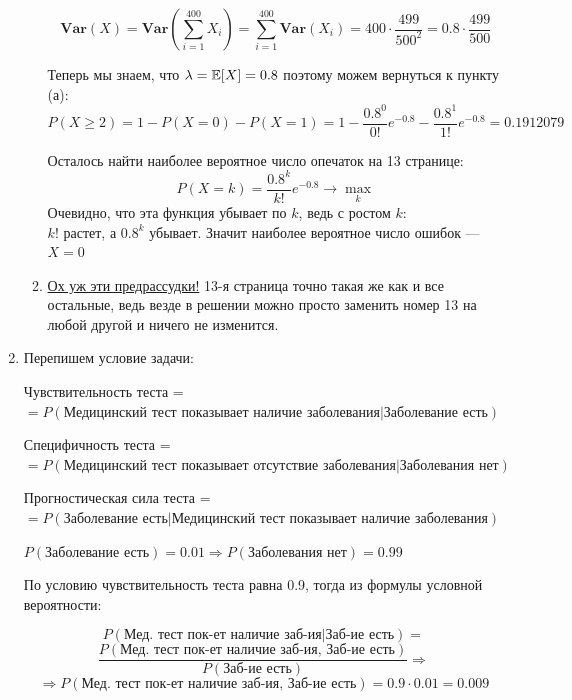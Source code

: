 \documentclass[12pt, a4paper]{article}\usepackage[]{graphicx}\usepackage[]{color}
\begin{document}
\begin{enumerate}
\begin{enumerate}
						$$
						\mathbf{Var}(X) = \mathbf{Var}\left(\sum\limits_{i=1}^{400}X_i\right) = \sum\limits_{i=1}^{400}\mathbf{Var}(X_i) = 400\cdot\frac{499}{500^2} = 0.8\cdot\frac{499}{500}
						$$

						Теперь мы знаем, что $\lambda = \mathbb{E}[X] = 0.8$ поэтому можем вернуться к пункту (а):
						$$
						P(X \geqslant 2) = 1 - P(X=0) - P(X=1)  = 1 - \frac{0.8^0}{0!}e^{-0.8} - \frac{0.8^1}{1!}e^{-0.8} = 0.1912079
						$$ \vspace{-1.2cm}

						\hspace{13cm} 

						Осталось найти наиболее вероятное число опечаток на 13 странице:
						$$
						P(X=k) = \frac{0.8^k}{k!}e^{-0.8} \rightarrow \max \limits_k
						$$
						Очевидно, что эта функция убывает по $k$, ведь с ростом $k$:\\
						$k!$ растет, а $0.8^k$ убывает. Значит наиболее вероятное число ошибок — $X = 0$


						\item \href{https://en.wikipedia.org/wiki/Triskaidekaphobia}{Ох уж эти предрассудки!} 13-я страница точно такая же как и все остальные, ведь везде в решении можно просто заменить номер 13 на любой другой и ничего не изменится.

					\end{enumerate}

					\item
					Перепишем условие задачи:

					Чувствительность теста = \\$=P(\text{Медицинский тест показывает наличие заболевания} | \text{Заболевание есть})$

					Специфичность теста = \\$=P(\text{Медицинский тест показывает отсутствие заболевания} | \text{Заболевания нет})$

					Прогностическая сила теста = \\$=P(\text{Заболевание есть} | \text{Медицинский тест показывает наличие заболевания})$

					$P(\text{Заболевание есть}) = 0.01 \Rightarrow P(\text{Заболевания нет}) = 0.99 $

					По условию чувствительность теста равна 0.9, тогда из формулы условной вероятности:

					$$P(\text{Мед. тест пок-ет наличие заб-ия} | \text{Заб-ие есть}) = $$
					$$\dfrac{P(\text{Мед. тест пок-ет наличие заб-ия, Заб-ие есть})}{P(\text{Заб-ие есть})} \Rightarrow$$
					$$\Rightarrow P(\text{Мед. тест пок-ет наличие заб-ия, Заб-ие есть}) = 0.9 \cdot 0.01 = 0.009$$


\end{enumerate}
\end{document}
